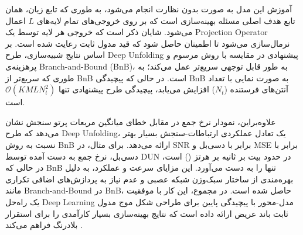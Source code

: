آموزش این مدل به صورت بدون نظارت انجام می‌شود، به طوری که تابع زیان، همان تابع هدف اصلی مسئله بهینه‌سازی است که بر روی خروجی‌های تمام لایه‌های 
$L$
اعمال می‌شود. شایان ذکر است که خروجی هر لایه توسط یک 
\gls{Projection Operator}
نرمال‌سازی می‌شود تا اطمینان حاصل شود که قید مدول ثابت رعایت شده است.
	بر اساس نتایج شبیه‌سازی، طرح 
\gls{Deep Unfolding}
	 پیشنهادی در مقایسه با روش مرسوم و پرهزینه‌ی 
\gls{Branch-and-Bound}
	  (BnB)،
	   به طور قابل توجهی سریع‌تر عمل می‌کند؛ به طوری که 
	    سریع‌تر از BnB است. در حالی که پیچیدگی BnB به صورت نمایی با تعداد آنتن‌های فرستنده 
($N_t$)
	 افزایش می‌یابد، پیچیدگی طرح پیشنهادی تنها
$\mathcal{O}(KMLN_t^2)$
است. 

علاوه‌براین، نمودار نرخ جمع در مقابل خطای میانگین مربعات پرتو سنجش نشان می‌دهد که طرح 
\gls{Deep Unfolding}،
 یک تعادل عملکردی ارتباطات-سنجش بسیار بهتر نسبت به روش BnB ارائه می‌دهد. برای مثال، در SNR برابر با 
دسی‌بل 
و MSE برابر با 
دسی‌بل،
 نرخ جمع به دست آمده توسط DUN در حدود 
  بیت بر ثانیه بر هرتز 
()
   است، در حالی که BnB تنها 
    را به دست می‌آورد. این مزایای سرعت و عملکرد، به دلیل بهره‌مندی از ساختار سبک‌وزن شبکه عصبی و عدم نیاز به پردازش‌های اضافی تکراری مانند
\gls{Branch-and-Bound}
     در BnB، حاصل شده است.
	در مجموع، این کار با موفقیت یک راه‌حل 
\gls{Deep Learning}
	مدل-محور با پیچیدگی پایین برای طراحی شکل موج مدول ثابت
	  باند عریض ارائه داده است که نتایج بهینه‌سازی بسیار کارآمدی را برای استقرار بلادرنگ فراهم می‌کند
\cite{ConstantModulus}.
	
